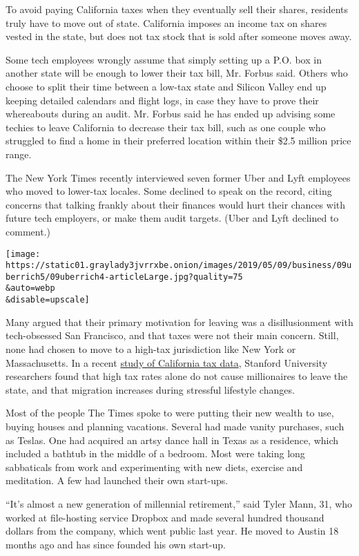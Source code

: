To avoid paying California taxes when they eventually sell their shares,
residents truly have to move out of state. California imposes an income
tax on shares vested in the state, but does not tax stock that is sold
after someone moves away.

Some tech employees wrongly assume that simply setting up a P.O. box in
another state will be enough to lower their tax bill, Mr. Forbus said.
Others who choose to split their time between a low-tax state and
Silicon Valley end up keeping detailed calendars and flight logs, in
case they have to prove their whereabouts during an audit. Mr. Forbus
said he has ended up advising some techies to leave California to
decrease their tax bill, such as one couple who struggled to find a home
in their preferred location within their \$2.5 million price range.

The New York Times recently interviewed seven former Uber and Lyft
employees who moved to lower-tax locales. Some declined to speak on the
record, citing concerns that talking frankly about their finances would
hurt their chances with future tech employers, or make them audit
targets. (Uber and Lyft declined to comment.)

\texttt{[image: https://static01.graylady3jvrrxbe.onion/images/2019/05/09/business/09uberrich5/09uberrich4-articleLarge.jpg?quality=75\\\&auto=webp\\\&disable=upscale]}

Many argued that their primary motivation for leaving was a
disillusionment with tech-obsessed San Francisco, and that taxes were
not their main concern. Still, none had chosen to move to a high-tax
jurisdiction like New York or Massachusetts. In a recent
\href{https://inequality.stanford.edu/sites/default/files/millionaire-migration-california-impact-top-tax-rates.pdf}{study
of California tax data}, Stanford University researchers found that high
tax rates alone do not cause millionaires to leave the state, and that
migration increases during stressful lifestyle changes.

Most of the people The Times spoke to were putting their new wealth to
use, buying houses and planning vacations. Several had made vanity
purchases, such as Teslas. One had acquired an artsy dance hall in Texas
as a residence, which included a bathtub in the middle of a bedroom.
Most were taking long sabbaticals from work and experimenting with new
diets, exercise and meditation. A few had launched their own start-ups.

``It's almost a new generation of millennial retirement,'' said Tyler
Mann, 31, who worked at file-hosting service Dropbox and made several
hundred thousand dollars from the company, which went public last year.
He moved to Austin 18 months ago and has since founded his own start-up.

